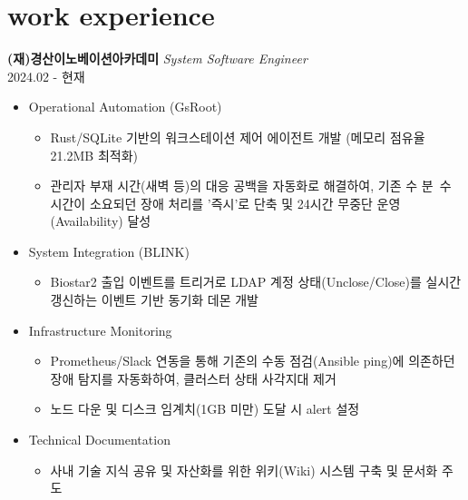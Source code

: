 \documentclass[10pt, a4paper]{article}
\newcommand{\descstyle}{\lightfont\fontsize{9.5pt}{10pt}\selectfont}
\newcommand{\jobtitle}[2]{{\normalsize\textbf{#1}} \hfill {\descstyle\textit{#2}}}
\newcommand{\dates}[1]{\hfill {\descstyle\color{lightGray} #1}}
\begin{document}
\hfill
\begin{minipage}[t]{0.62\textwidth} %

    \section*{\huge{work experience}}
    
    \jobtitle{(재)경산이노베이션아카데미}{System Software Engineer} \\
    \dates{2024.02 - 현재}
    \begin{itemize}[label=\textbullet] 
        \descstyle 
        \item Operational Automation (GsRoot)
        \begin{itemize}
            \item Rust/SQLite 기반의 워크스테이션 제어 에이전트 개발 (메모리 점유율 21.2MB 최적화)
            \item 관리자 부재 시간(새벽 등)의 대응 공백을 자동화로 해결하여, 기존 수 분~수 시간이 소요되던 장애 처리를 '즉시'로 단축 및 24시간 무중단 운영(Availability) 달성
        \end{itemize}
        
        \item System Integration (BLINK)
        \begin{itemize}
            \item Biostar2 출입 이벤트를 트리거로 LDAP 계정 상태(Unclose/Close)를 실시간 갱신하는 이벤트 기반 동기화 데몬 개발
        \end{itemize}
        
        \item Infrastructure Monitoring
        \begin{itemize}
            \item Prometheus/Slack 연동을 통해 기존의 수동 점검(Ansible ping)에 의존하던 장애 탐지를 자동화하여, 클러스터 상태 사각지대 제거
            \item 노드 다운 및 디스크 임계치(1GB 미만) 도달 시 alert 설정
        \end{itemize}
        
        \item Technical Documentation
        \begin{itemize}
            \item 사내 기술 지식 공유 및 자산화를 위한 위키(Wiki) 시스템 구축 및 문서화 주도
        \end{itemize}
    \end{itemize}


\end{minipage}
\end{document}
